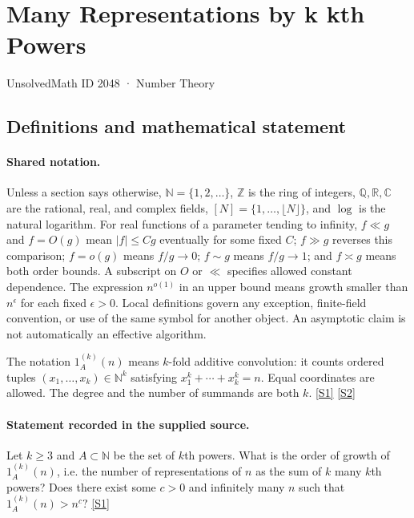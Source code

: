 \documentclass[11pt,a4paper]{article}
\newcommand{\N}{\mathbb{N}}
\newcommand{\Z}{\mathbb{Z}}
\newcommand{\Q}{\mathbb{Q}}
\newcommand{\R}{\mathbb{R}}
\newcommand{\C}{\mathbb{C}}
\newcommand{\sref}[2]{\hyperlink{source:#1:#2}{[S#2]}}
\begin{document}

\setcounter{section}{2047}

\section{Many Representations by k kth Powers}\label{2048}

{\small\sffamily UnsolvedMath ID 2048 · Number Theory}

\subsection{Definitions and mathematical statement}

\paragraph{Shared notation.}Unless a section says otherwise, $\N=\{1,2,\ldots\}$,
$\Z$ is the ring of integers, $\Q,\R,\C$ are the rational, real, and complex
fields, $[N]=\{1,\ldots,\lfloor N\rfloor\}$, and $\log$ is the natural
logarithm. For real functions of a parameter tending to infinity,
$f\ll g$ and $f=O(g)$ mean $|f|\leq Cg$ eventually for some fixed $C$;
$f\gg g$ reverses this comparison; $f=o(g)$ means $f/g\to0$;
$f\sim g$ means $f/g\to1$; and $f\asymp g$ means both order bounds.
A subscript on $O$ or $\ll$ specifies allowed constant dependence.
The expression $n^{o(1)}$ in an upper bound means growth smaller than
$n^\epsilon$ for each fixed $\epsilon>0$. Local definitions govern any
exception, finite-field convention, or use of the same symbol for another
object. An asymptotic claim is not automatically an effective algorithm.



The notation $1_A^{(k)}(n)$ means $k$-fold additive convolution: it counts ordered tuples $(x_1,\ldots,x_k)\in\N^k$ satisfying $x_1^k+\cdots+x_k^k=n$. Equal coordinates are allowed. The degree and the number of summands are both $k$. \sref{2048}{1} \sref{2048}{2}

\paragraph{Statement recorded in the supplied source.}
Let $k\geq 3$ and $A\subset \mathbb{N}$ be the set of $k$th powers. What is the order of growth of $1_A^{(k)}(n)$, i.e. the number of representations of $n$ as the sum of $k$ many $k$th powers? Does there exist some $c>0$ and infinitely many $n$ such that $ 1_A^{(k)}(n) >n^c? $ \sref{2048}{1}
\end{document}
